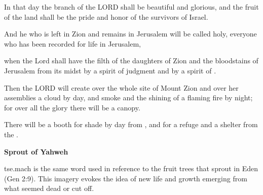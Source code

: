 \documentclass[11pt]{article}
\begin{document}

{\vspace{3em}}


\begin{biblicaloutline}[Isaiah 4:2-6]


\begin{versesection}{2em}
 In that day the branch of the LORD shall be beautiful and glorious,
\poetryline and the fruit of the land shall be the pride and honor
\poetryline of the survivors of Israel.

 And he who is left in Zion and remains in Jerusalem will be called holy,
\poetryline everyone who has been recorded for life in Jerusalem,
\end{versesection}


\begin{versesection}{2em}
 when the Lord shall have  the filth of the daughters of Zion
\poetryline and  the bloodstains of Jerusalem from its midst
\poetryline by a spirit of judgment and by a spirit of .

 Then the LORD will create over the whole site of Mount Zion
\poetryline and over her assemblies
\poetryline a cloud by day, and smoke and the shining of a flaming fire by night;
\poetryline for over all the glory there will be a canopy.

 There will be a booth for shade by day from ,
\poetryline and for a refuge and a shelter from the .
\end{versesection}

\end{biblicaloutline}

\vspace{3em}
{\large\bfseries Sprout of Yahweh}
\vspace{1em}


tse.mach is the same word used in reference to the fruit trees that sprout in Eden (Gen 2:9). This imagery evokes the idea of new life and growth emerging from what seemed dead or cut off.
\vspace{1em}
\end{document}
